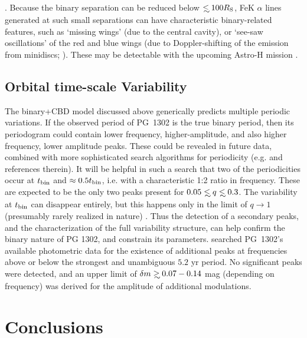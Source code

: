 . Because the binary separation can
be reduced below $\lsim 100 R_{\rm{S}}$, FeK $\alpha$ lines generated at such
small separations can have characteristic binary-related features,
such as `missing wings' (due to the central cavity), or `see-saw
oscillations' of the red and blue wings (due to Doppler-shifting of
the emission from minidiscs; \citealt{McKFeZoltan:2013}).  These may be
detectable with the upcoming Astro-H mission \citep{AstroH:2014}.





\subsection{Orbital time-scale Variability}
\label{SS:OTV}
The binary+CBD model discussed above generically predicts multiple
periodic variations. If the observed period of PG~1302 is the true
binary period, then its periodogram could contain lower frequency,
higher-amplitude, and also higher frequency, lower amplitude peaks.
These could be revealed in future data, combined with more
sophisticated search algorithms for periodicity
(e.g. \citealt{VanderPlasIvezic2015} and references therein).  It will
be helpful in such a search that two of the periodicities occur at
$t_{\rm{bin}}$ and $\approx 0.5t_{\rm{bin}}$, i.e. with a characteristic 1:2
ratio in frequency. These are expected to be the only two peaks
present for $0.05\lsim q \lsim 0.3$.  The variability at $t_{\rm{bin}}$
can disappear entirely, but this happens only in the limit of
$q\rightarrow1$ (presumably rarely realized in nature) .  Thus the
detection of a secondary peaks, and the characterization of the full
variability structure, can help confirm the binary nature of PG 1302,
and constrain its parameters.  \citet{Charisi:2015:PG1302} 
searched PG~1302's available
photometric data for the existence of additional peaks at frequencies
above or below the strongest and unambiguous $5.2$ yr period. No
significant peaks were detected, and an upper limit of $\delta m \gsim
0.07-0.14$ mag (depending on frequency) was derived for the amplitude of
additional modulations.






\vspace{-\baselineskip}
\section{Conclusions}
\label{S:Conclude}

